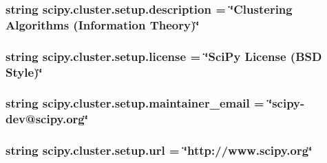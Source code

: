 \subsubsection[{description}]{\setlength{\rightskip}{0pt plus 5cm}string scipy.\+cluster.\+setup.\+description = \char`\"{}Clustering Algorithms ({\bf Information} Theory)\char`\"{}}\label{namespacescipy_1_1cluster_1_1setup_afbe9aabb851c1560329f84cb7e4d6c08}
\hypertarget{namespacescipy_1_1cluster_1_1setup_a7178ce4c13b952f048081ada27247ba4}{}
\subsubsection[{license}]{\setlength{\rightskip}{0pt plus 5cm}string scipy.\+cluster.\+setup.\+license = \char`\"{}Sci\+Py License (B\+S\+D Style)\char`\"{}}\label{namespacescipy_1_1cluster_1_1setup_a7178ce4c13b952f048081ada27247ba4}
\hypertarget{namespacescipy_1_1cluster_1_1setup_a34dd09f4e5cb0046db41763ae69caab2}{}
\subsubsection[{maintainer\+\_\+email}]{\setlength{\rightskip}{0pt plus 5cm}string scipy.\+cluster.\+setup.\+maintainer\+\_\+email = \char`\"{}scipy-\/dev@scipy.\+org\char`\"{}}\label{namespacescipy_1_1cluster_1_1setup_a34dd09f4e5cb0046db41763ae69caab2}
\hypertarget{namespacescipy_1_1cluster_1_1setup_ad1dc45c1949a63588a6ed87705caf00f}{}
\subsubsection[{url}]{\setlength{\rightskip}{0pt plus 5cm}string scipy.\+cluster.\+setup.\+url = \char`\"{}http\+://www.\+scipy.\+org\char`\"{}}\label{namespacescipy_1_1cluster_1_1setup_ad1dc45c1949a63588a6ed87705caf00f}

